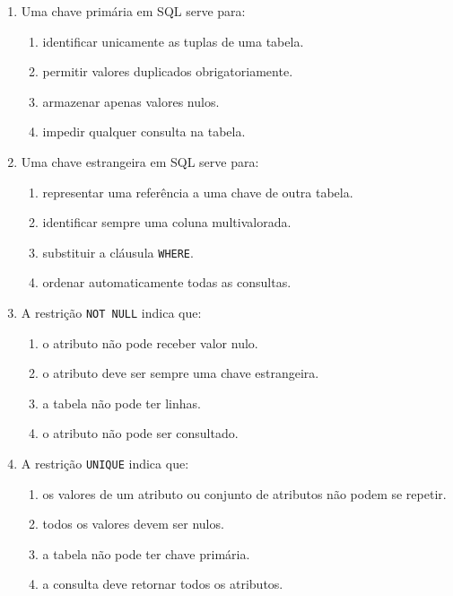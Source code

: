 \documentclass[12pt,a4paper]{article}
\begin{document}
\begin{enumerate}[label=\textbf{Q\arabic*.}]
\item Uma chave primária em SQL serve para:

\begin{enumerate}[label=\alph*)]
    \item identificar unicamente as tuplas de uma tabela.
    \item permitir valores duplicados obrigatoriamente.
    \item armazenar apenas valores nulos.
    \item impedir qualquer consulta na tabela.
\end{enumerate}

\item Uma chave estrangeira em SQL serve para:

\begin{enumerate}[label=\alph*)]
    \item representar uma referência a uma chave de outra tabela.
    \item identificar sempre uma coluna multivalorada.
    \item substituir a cláusula \texttt{WHERE}.
    \item ordenar automaticamente todas as consultas.
\end{enumerate}

\item A restrição \texttt{NOT NULL} indica que:

\begin{enumerate}[label=\alph*)]
    \item o atributo não pode receber valor nulo.
    \item o atributo deve ser sempre uma chave estrangeira.
    \item a tabela não pode ter linhas.
    \item o atributo não pode ser consultado.
\end{enumerate}

\item A restrição \texttt{UNIQUE} indica que:

\begin{enumerate}[label=\alph*)]
    \item os valores de um atributo ou conjunto de atributos não podem se repetir.
    \item todos os valores devem ser nulos.
    \item a tabela não pode ter chave primária.
    \item a consulta deve retornar todos os atributos.
\end{enumerate}


\end{enumerate}
\end{document}
